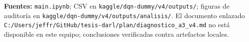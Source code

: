 \documentclass[10pt,a4paper]{article}
\begin{document}
\vspace{-2pt}
{\scriptsize\textbf{Fuentes:} \texttt{main.ipynb}; CSV en
\texttt{kaggle/dqn-dummy/v4/outputs/}; figuras de auditoría en
\texttt{kaggle/dqn-dummy/v4/outputs/analisis/}. El documento enlazado
\texttt{C:/Users/jeffr/GitHub/tesis-darl/plan/diagnostico\_a3\_v4.md} no está
disponible en este equipo; conclusiones verificadas contra artefactos locales.}
\end{document}
